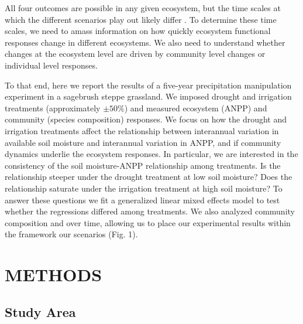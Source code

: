 \documentclass[fleqn,10pt,lineno]{wlpeerj} %
\begin{document}
All four outcomes are possible in any given ecosystem, but the time
scales at which the different scenarios play out likely differ
\citep{Smith2009, Wilcox2016, Knapp2017}. To determine these time
scales, we need to amass information on how quickly ecosystem functional
responses change in different ecosystems. We also need to understand
whether changes at the ecosystem level are driven by community level
changes or individual level responses.

To that end, here we report the results of a five-year precipitation
manipulation experiment in a sagebrush steppe grassland. We imposed
drought and irrigation treatments (approximately \(\pm50\%\)) and
measured ecosystem (ANPP) and community (species composition) responses.
We focus on how the drought and irrigation treatments affect the
relationship between interannual variation in available soil moisture
and interannual variation in ANPP, and if community dynamics underlie
the ecosystem responses. In particular, we are interested in the
consistency of the soil moisture-ANPP relationship among treatments. Is
the relationship steeper under the drought treatment at low soil
moisture? Does the relationship saturate under the irrigation treatment
at high soil moisture? To answer these questions we fit a generalized
linear mixed effects model to test whether the regressions differed
among treatments. We also analyzed community composition and
 over
time, allowing us to place our experimental results within the framework
our scenarios (Fig. 1).

\hypertarget{methods}{%
\section{METHODS}\label{methods}}

\hypertarget{study-area}{%
\subsection{Study Area}\label{study-area}}
\end{document}
